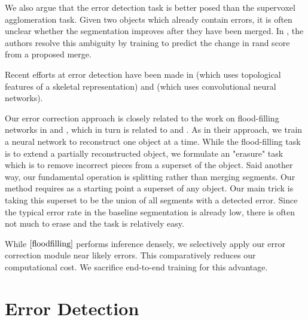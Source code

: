\documentclass{article}
\begin{document}
We also argue that the error detection task is better posed than the supervoxel agglomeration task. Given two objects which already contain errors, it is often unclear whether the segmentation improves after they have been merged. In \cite{lash}, the authors resolve this ambiguity by training to predict the change in rand score from a proposed merge.

Recent efforts at error detection have been made in \cite{multipass} (which uses topological features of a skeletal representation) and \cite{mergenet} (which uses convolutional neural networks).

Our error correction approach is closely related to the work on flood-filling networks in \cite{floodfilling} and \cite{multipass}, which in turn is related to \cite{recurrent_instance_seg_1} and \cite{recurrent_instance_seg_2}. As in their approach, we train a neural network to reconstruct one object at a time. While the flood-filling task is to extend a partially reconstructed object, we formulate an "erasure" task which is to remove incorrect pieces from a superset of the object. Said another way, our fundamental operation is splitting rather than merging segments. Our method requires as a starting point a superset of any object. Our main trick is taking this superset to be the union of all segments with a detected error. Since the typical error rate in the baseline segmentation is already low, there is often not much to erase and the task is relatively easy.

While $\cite{floodfilling}$ performs inference densely, we selectively apply our error correction module near likely errors. This comparatively reduces our computational cost. We sacrifice end-to-end training for this advantage.


\section{Error Detection}
\end{document}
